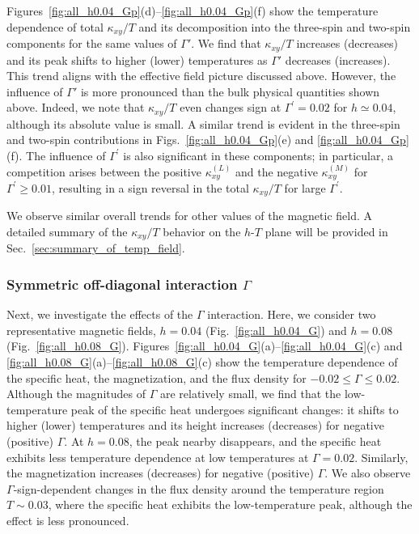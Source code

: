 \documentclass[twocolumn,superscriptaddress,showpacs, longbibliography, aps, prx]{revtex4-2}
\begin{document}
Figures~\ref{fig:all_h0.04_Gp}(d)--\ref{fig:all_h0.04_Gp}(f) show the temperature dependence of total $\kappa_{xy}/T$ and its decomposition into the three-spin and two-spin components for the same values of $\Gamma'$. 
We find that $\kappa_{xy}/T$ increases (decreases) and its peak shifts to higher (lower) temperatures as $\Gamma'$ decreases (increases). 
This trend aligns with the effective field picture discussed above. 
However, the influence of $\Gamma'$ is more pronounced than the bulk physical quantities shown above. 
Indeed, we note that $\kappa_{xy}/T$ even changes sign at $\Gamma^{\prime} = 0.02$ for $h\simeq0.04$, although its absolute value is small. 
A similar trend is evident in the three-spin and two-spin contributions in Figs.~\ref{fig:all_h0.04_Gp}(e) and \ref{fig:all_h0.04_Gp}(f). 
The influence of $\Gamma^{\prime}$ is also significant in these components; in particular, a competition arises between the positive $\kappa_{xy}^{(L)}$ and the negative $\kappa_{xy}^{(M)}$ for $\Gamma^{\prime}\geq0.01$, resulting in a sign reversal in the total $\kappa_{xy}/T$ for large $\Gamma^{\prime}$. 

We observe similar overall trends for other values of the magnetic field. 
A detailed summary of the $\kappa_{xy}/T$ behavior on the $h$-$T$ plane will be provided in Sec.~\ref{sec:summary_of_temp_field}.

\subsubsection{Symmetric off-diagonal interaction $\Gamma$}\label{subsec:Gamma}
Next, we investigate the effects of the $\Gamma$ interaction. 
Here, we consider two representative magnetic fields, $h=0.04$ (Fig.~\ref{fig:all_h0.04_G}) and $h=0.08$ (Fig.~\ref{fig:all_h0.08_G}).
Figures~\ref{fig:all_h0.04_G}(a)--\ref{fig:all_h0.04_G}(c) and \ref{fig:all_h0.08_G}(a)--\ref{fig:all_h0.08_G}(c) show the temperature dependence of the specific heat, the magnetization, and the flux density for $-0.02\leq\Gamma\leq0.02$. 
Although the magnitudes of $\Gamma$ are relatively small, we find that the low-temperature peak of the specific heat undergoes significant changes: 
it shifts to higher (lower) temperatures and its height increases (decreases) for negative (positive) $\Gamma$.
At $h=0.08$, the peak nearby disappears, and the specific heat exhibits less temperature dependence at low temperatures at $\Gamma=0.02$. 
Similarly, the magnetization increases (decreases) for negative (positive) $\Gamma$. 
We also observe $\Gamma$-sign-dependent changes in the flux density around the temperature region $T\sim0.03$, where the specific heat exhibits the low-temperature peak, although the effect is less pronounced. 
\end{document}
